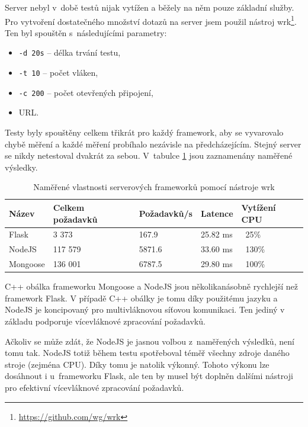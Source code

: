 Server nebyl v~době testů nijak vytížen a běžely na něm pouze základní služby. Pro vytvoření dostatečného množství dotazů na server jsem použil nástroj wrk\footnote{\url{https://github.com/wg/wrk}}. Ten byl spouštěn s~následujícími parametry:

\begin{itemize}
    \item \texttt{-d 20s} -- délka trvání testu,
    \item \texttt{-t 10} -- počet vláken,
    \item \texttt{-c 200} -- počet otevřených připojení,
    \item URL.
\end{itemize}

Testy byly spouštěny celkem třikrát pro každý framework, aby se vyvarovalo chybě měření a každé měření probíhalo nezávisle na předcházejícím. Stejný server se nikdy netestoval dvakrát za sebou. V~tabulce \ref{tab:server} jsou zaznamenány naměřené výsledky.

\begin{table}[ht]
\centering
\caption{Naměřené vlastnosti serverových frameworků pomocí nástroje wrk}
\label{tab:server}
\begin{tabular}{|l|l|l|l|l|}
\hline
    Název       & Celkem požadavků  & Požadavků/s   & Latence   & Vytížení CPU\\ \hline
    Flask       & 3 373             & 167.9         & 25.82 ms  & ~25\%\\
    NodeJS      & 117 579           & 5871.6        & 33.60 ms  & ~130\%\\
    Mongoose    & 136 001           & 6787.5        & 29.80 ms  & ~100\%\\
   \hline
\end{tabular}
\end{table}

C++ obálka frameworku Mongoose a NodeJS jsou několikanásobně rychlejší než framework Flask. V případě C++ obálky je tomu díky použitému jazyku a NodeJS je koncipovaný pro multivláknovou síťovou komunikaci. Ten jediný v základu podporuje vícevláknové zpracování požadavků. 

Ačkoliv se může zdát, že NodeJS je jasnou volbou z~naměřených výsledků, není tomu tak. NodeJS totiž během testu spotřeboval téměř všechny zdroje daného stroje (zejména CPU). Díky tomu je natolik výkonný. Tohoto výkonu lze dosáhnout i u~frameworku Flask, ale ten by musel být doplněn dalšími nástroji pro efektivní vícevláknové zpracování požadavků.

